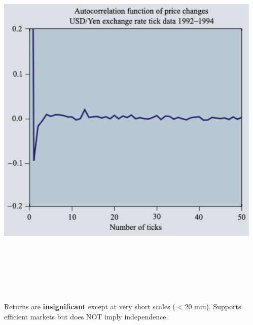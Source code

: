 \documentclass[final]{beamer}
\begin{document}
\begin{frame}[t]
\begin{columns}[t]
\begin{column}{.48\linewidth}
\begin{tcolorbox}[mybox, title=Linear Autocorrelations]
\begin{center}
\includegraphics[width=0.95\linewidth,height=18cm,keepaspectratio]{figure6_autocorr.png}
\end{center}
\vspace{0.3cm}
\large
Returns are \textbf{insignificant} except at very short scales ($<$20 min). Supports efficient markets but does NOT imply independence.
\end{tcolorbox}

\end{column}

\begin{column}{.48\linewidth}


\end{column}
\end{columns}
\end{frame}
\end{document}

